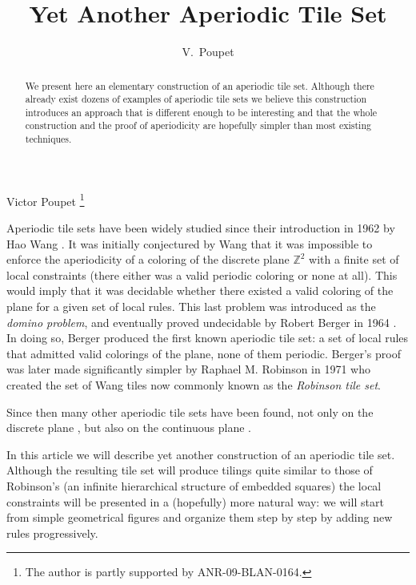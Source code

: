 \documentclass{jac}
\newcommand{\ZZ}{\mathbb{Z}}
\begin{document}
    
\title{Yet Another Aperiodic Tile Set}
\author {V.~Poupet}{Victor Poupet}
\thanks{The author is partly supported by ANR-09-BLAN-0164.}
\address {LIF Marseille}


\begin{abstract}
    \noindent We present here an elementary construction of an aperiodic tile set. Although there already exist dozens of examples of aperiodic tile sets we believe this construction introduces an approach that is different enough to be interesting and that the whole construction and the proof of aperiodicity are hopefully simpler than most existing techniques.
\end{abstract}

\maketitle

Aperiodic tile sets have been widely studied since their introduction in 1962 by Hao Wang \cite{KahrMooreWang62}. It was initially conjectured by Wang that it was impossible to enforce the aperiodicity of a coloring of the discrete plane $\ZZ^2$ with a finite set of local constraints (there either was a valid periodic coloring or none at all). This would imply that it was decidable whether there existed a valid coloring of the plane for a given set of local rules. This last problem was introduced as the \emph{domino problem}, and eventually proved undecidable by Robert Berger in 1964 \cite{Berger64, Berger66}. In doing so, Berger produced the first known aperiodic tile set: a set of local rules that admitted valid colorings of the plane, none of them periodic. Berger's proof was later made significantly simpler by Raphael M. Robinson in 1971 \cite{Robinson71} who created the set of Wang tiles now commonly known as the \emph{Robinson tile set}.

Since then many other aperiodic tile sets have been found, not only on the discrete plane \cite{DurandLevinShen04, DurandShenRomashchenko08, Kari07, Ollinger08}, but also on the continuous plane \cite{Goodman-Strauss99, Penrose78}.

In this article we will describe yet another construction of an aperiodic tile set. Although the resulting tile set will produce tilings quite similar to those of Robinson's (an infinite hierarchical structure of embedded squares) the local constraints will be presented in a (hopefully) more natural way: we will start from simple geometrical figures and organize them step by step by adding new rules progressively.
\end{document}
